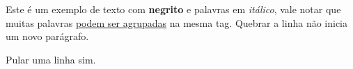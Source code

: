 \documentclass{article}
\begin{document}
Este é um exemplo de texto com \textbf{negrito} e palavras em \textit{itálico}, vale notar que muitas palavras \underline{podem ser agrupadas} na mesma tag.
Quebrar a linha não inicia um novo parágrafo.

Pular uma linha sim.
\end{document}
